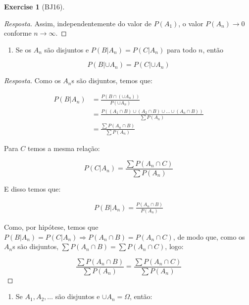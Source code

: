 \documentclass[
]{article}
\providecommand{\tightlist}{%
  \setlength{\itemsep}{0pt}\setlength{\parskip}{0pt}}
\theoremstyle{definition}
\theoremstyle{definition}
\theoremstyle{definition}
\newtheorem{exercise}{Exercise}[section]
\theoremstyle{definition}
\theoremstyle{remark}
\begin{document}
\begin{exercise}[BJ16]
\begin{proof}[Resposta]
Assim, independentemente do valor de \(P(A_{1})\), o valor \(P(A_{n}) \to 0\) conforme \(n \to \infty\).
\end{proof}

\begin{enumerate}
\def\labelenumi{\alph{enumi})}
\setcounter{enumi}{3}
\tightlist
\item
  Se os \(A_{n}\) são disjuntos e \(P(B|A_{n}) = P(C|A_{n})\) para todo \(n\), então
\end{enumerate}

\begin{equation*}
P(B|\cup A_{n}) = P(C|\cup A_{n})
\end{equation*}

\begin{proof}[Resposta]
Como os \(A_{n}\)s são disjuntos, temos que:

\begin{align*}
P(B|A_{n}) &= \frac{P(B \cap (\cup A_{n}))}{P(\cup A_{n})} \\
&= \frac{P((A_{1} \cap B) \cup (A_{2} \cap B) \cup \dots \cup (A_{n} \cap B))}{\sum P(A_{n})} \\
&= \frac{\sum P(A_{n} \cap B)}{\sum P(A_{n})}
\end{align*}

Para \(C\) temos a mesma relação:

\begin{equation*}
P(C|A_{n}) = \frac{\sum P(A_{n} \cap C)}{\sum P(A_{n})}
\end{equation*}

E disso temos que:

\begin{align*}
P(B|A_{n}) = \frac{P(A_{n} \cap B)}{P(A_{n})}
\end{align*}

Como, por hipótese, temos que \(P(B|A_{n}) = P(C|A_{n}) \Rightarrow P(A_{n} \cap B) = P(A_{n} \cap C)\), de modo que, como os \(A_{n}\)s são disjuntos, \(\sum P(A_{n} \cap B) = \sum P(A_{n} \cap C)\), logo:

\begin{equation*}
\frac{\sum P(A_{n} \cap B)}{\sum P(A_{n})} = \frac{\sum P(A_{n} \cap C)}{\sum P(A_{n})}
\end{equation*}
\end{proof}

\begin{enumerate}
\def\labelenumi{\alph{enumi})}
\setcounter{enumi}{4}
\tightlist
\item
  Se \(A_{1}, A_{2}, \ldots\) são disjuntos e \(\cup A_{n} = \Omega\), então:
\end{enumerate}


\end{exercise}
\end{document}
